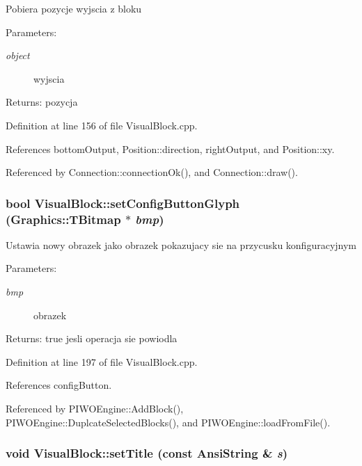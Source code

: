 Pobiera pozycje wyjscia z bloku \begin{Desc}
\item[Parameters:]
\begin{description}
\item[{\em object}]wyjscia \end{description}
\end{Desc}
\begin{Desc}
\item[Returns:]pozycja \end{Desc}


Definition at line 156 of file VisualBlock.cpp.

References bottomOutput, Position::direction, rightOutput, and Position::xy.

Referenced by Connection::connectionOk(), and Connection::draw().\hypertarget{classVisualBlock_c7db3e3d6aabc762ea055453855c7448}{
\subsubsection[setConfigButtonGlyph]{\setlength{\rightskip}{0pt plus 5cm}bool VisualBlock::setConfigButtonGlyph (Graphics::TBitmap $\ast$ {\em bmp})}}
\label{classVisualBlock_c7db3e3d6aabc762ea055453855c7448}


Ustawia nowy obrazek jako obrazek pokazujacy sie na przycusku konfiguracyjnym \begin{Desc}
\item[Parameters:]
\begin{description}
\item[{\em bmp}]obrazek \end{description}
\end{Desc}
\begin{Desc}
\item[Returns:]true jesli operacja sie powiodla \end{Desc}


Definition at line 197 of file VisualBlock.cpp.

References configButton.

Referenced by PIWOEngine::AddBlock(), PIWOEngine::DuplcateSelectedBlocks(), and PIWOEngine::loadFromFile().\hypertarget{classVisualBlock_62361923d36c7162a2ce8919e4f0949f}{
\subsubsection[setTitle]{\setlength{\rightskip}{0pt plus 5cm}void VisualBlock::setTitle (const AnsiString \& {\em s})}}
\label{classVisualBlock_62361923d36c7162a2ce8919e4f0949f}


